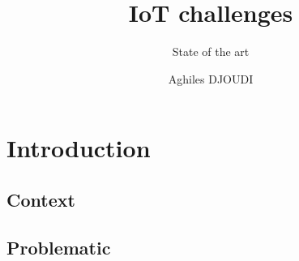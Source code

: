 \documentclass[8pt]{beamer}
\begin{document}
\title{IoT challenges}
\subtitle{State of the art}
\author{Aghiles DJOUDI}

\firstpage

\section{Introduction}
	\subsection*{Context}
		
	\subsection*{Problematic}
		
%		
%		
%		

\tableofcontent

%		
%		
\end{document}
